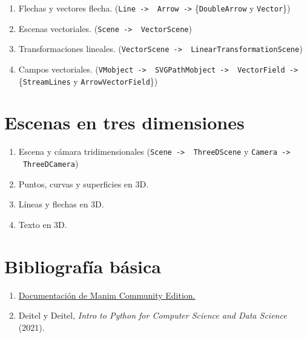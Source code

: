 \documentclass[a4paper]{article}
\begin{document}
\begin{enumerate}

\item Flechas y vectores flecha. (\texttt{Line -> \ Arrow ->} \{\texttt{DoubleArrow} y \texttt{Vector}\})

\item Escenas vectoriales. (\texttt{Scene -> \ VectorScene})

\item Transformaciones lineales. (\texttt{VectorScene -> \ LinearTransformationScene})

\item Campos vectoriales. (\texttt{VMobject -> \ SVGPathMobject -> \ VectorField ->} \{\texttt{StreamLines} y \texttt{ArrowVectorField}\})
\end{enumerate}

\section{Escenas en tres dimensiones} \label{Sec: Escenas en tres dimensiones}

\begin{enumerate}

    \item Escena y cámara tridimensionales (\texttt{Scene -> \ ThreeDScene} y \texttt{Camera -> \ ThreeDCamera})

    \item Puntos, curvas y superficies en 3D.

    \item Líneas y flechas en 3D.

    \item Texto en 3D.
\end{enumerate}

\section*{Bibliografía básica} \label{Sec: Bibliografía básica}

\begin{enumerate}

    \item \href{https://docs.manim.community/en/stable/index.html}{Documentación de Manim Community Edition.}


    \item Deitel y Deitel,  \emph{Intro to Python for Computer Science and Data Science} (2021).
\end{enumerate}
\end{document}
